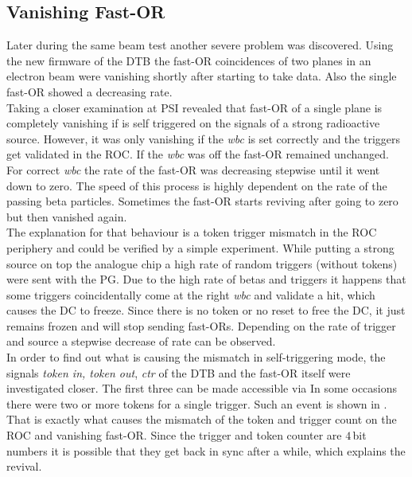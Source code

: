 \documentclass[british,11pt,a4paper]{memoir}
\begin{document}
\subsection{Vanishing Fast-OR}
Later during the same beam test another severe problem was discovered. Using the new firmware of the \ac{DTB} the fast-OR coincidences of two planes in an electron beam were vanishing shortly after starting to take data. Also the single fast-OR showed a decreasing rate.\\
Taking a closer examination at PSI revealed that fast-OR of a single plane is completely vanishing if is self triggered on the signals of a strong radioactive  source. However, it was only vanishing if the \textit{wbc} is set correctly and the triggers get validated in the \ac{ROC}. If the \textit{wbc} was off the fast-OR remained unchanged. For correct \textit{wbc} the rate of the fast-OR was decreasing stepwise until it went down to zero. The speed of this process is highly dependent on the rate of the passing beta particles. Sometimes the fast-OR starts reviving after going to zero but then vanished again.\\
The explanation for that behaviour is a token trigger mismatch in the \ac{ROC} periphery and could be verified by a simple experiment. While putting a strong source on top the analogue chip a high rate of random triggers (without tokens) were sent with the \ac{PG}. Due to the high rate of betas and triggers it happens that some triggers coincidentally come at the right \textit{wbc} and validate a hit, which causes the \ac{DC} to freeze. Since there is no token or no reset to free the \ac{DC}, it just remains frozen and will stop sending fast-ORs. Depending on the rate of trigger and source a stepwise decrease of rate can be observed.\\
In order to find out what is causing the mismatch in self-triggering mode, the signals \textit{token in, token out}, \textit{ctr} of the \ac{DTB} and the fast-OR itself were investigated closer. The first three can be made accessible via
In some occasions there were two or more tokens for a single trigger. Such an event is shown in . That is exactly what causes the mismatch of the token and trigger count on the \ac{ROC} and vanishing fast-OR. Since the trigger and token counter are $4\,$bit numbers it is possible that they get back in sync after a while, which explains the revival.\\
\end{document}
